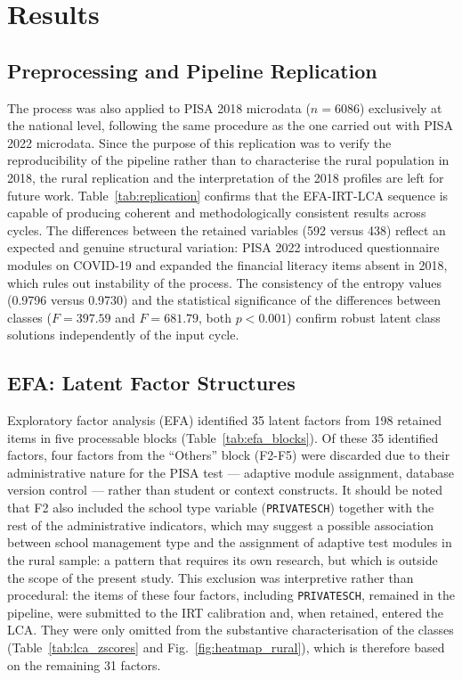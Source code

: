 \documentclass[runningheads]{llncs}
\begin{document}
\section{Results}
\label{sec:results}

\subsection{Preprocessing and Pipeline Replication}

The process was also applied to PISA 2018 microdata
(\(n = 6086\)) exclusively at the national level, following the
same procedure as the one carried out with PISA 2022 microdata.
Since the purpose of this replication was to verify the
reproducibility of the pipeline rather than to characterise the
rural population in 2018, the rural replication and the
interpretation of the 2018 profiles are left for future work.
Table~\ref{tab:replication} confirms that the EFA-IRT-LCA
sequence is capable of producing coherent and methodologically
consistent results across cycles. The differences between the
retained variables (592 versus 438) reflect an expected and
genuine structural variation: PISA 2022 introduced questionnaire
modules on COVID-19 and expanded the financial literacy items
absent in 2018, which rules out instability of the process. The
consistency of the entropy values (0.9796 versus 0.9730) and the
statistical significance of the differences between classes
(\(F = 397.59\) and \(F = 681.79\), both \(p < 0.001\)) confirm
robust latent class solutions independently of the input cycle.

\subsection{EFA: Latent Factor Structures}

Exploratory factor analysis (EFA) identified 35 latent factors
from 198 retained items in five processable blocks
(Table~\ref{tab:efa_blocks}). Of these 35 identified factors,
four factors from the ``Others'' block (F2-F5) were discarded
due to their administrative nature for the PISA test ---
adaptive module assignment, database version control --- rather
than student or context constructs. It should be noted that F2
also included the school type variable (\texttt{PRIVATESCH})
together with the rest of the administrative indicators, which
may suggest a possible association between school management
type and the assignment of adaptive test modules in the rural
sample: a pattern that requires its own research, but which is
outside the scope of the present study. This exclusion was
interpretive rather than procedural: the items of these four
factors, including \texttt{PRIVATESCH}, remained in the
pipeline, were submitted to the IRT calibration and, when
retained, entered the LCA. They were only omitted from the
substantive characterisation of the classes
(Table~\ref{tab:lca_zscores} and Fig.~\ref{fig:heatmap_rural}),
which is therefore based on the remaining 31 factors.
\end{document}
